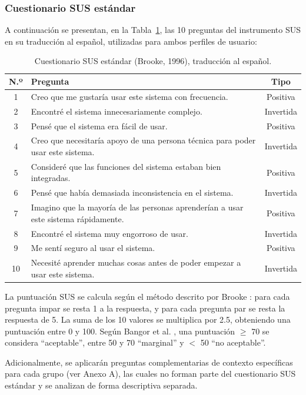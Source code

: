 \documentclass{iccmemoria}
\begin{document}
\subsubsection{Cuestionario SUS estándar}
A continuación se presentan, en la Tabla~\ref{tab:sus_cuestionario}, las 10 preguntas del instrumento SUS en su traducción al español, utilizadas para ambos perfiles de usuario:

\begin{table}[H]
\centering
\begin{tabular}{|c|p{10.5cm}|c|}
\hline
\textbf{N.º} & \textbf{Pregunta} & \textbf{Tipo} \\
\hline
1 & Creo que me gustaría usar este sistema con frecuencia. & Positiva \\
2 & Encontré el sistema innecesariamente complejo. & Invertida \\
3 & Pensé que el sistema era fácil de usar. & Positiva \\
4 & Creo que necesitaría apoyo de una persona técnica para poder usar este sistema. & Invertida \\
5 & Consideré que las funciones del sistema estaban bien integradas. & Positiva \\
6 & Pensé que había demasiada inconsistencia en el sistema. & Invertida \\
7 & Imagino que la mayoría de las personas aprenderían a usar este sistema rápidamente. & Positiva \\
8 & Encontré el sistema muy engorroso de usar. & Invertida \\
9 & Me sentí seguro al usar el sistema. & Positiva \\
10 & Necesité aprender muchas cosas antes de poder empezar a usar este sistema. & Invertida \\
\hline
\end{tabular}
\caption{Cuestionario SUS estándar (Brooke, 1996), traducción al español.}
\label{tab:sus_cuestionario}
\end{table}

La puntuación SUS se calcula según el método descrito por Brooke \cite{brooke1996}: para cada pregunta impar se resta 1 a la respuesta, y para cada pregunta par se resta la respuesta de 5. La suma de los 10 valores se multiplica por 2.5, obteniendo una puntuación entre 0 y 100. Según Bangor et al. \cite{bangor2008}, una puntuación $\geq$ 70 se considera ``aceptable'', entre 50 y 70 ``marginal'' y $<$ 50 ``no aceptable''.

Adicionalmente, se aplicarán preguntas complementarias de contexto específicas para cada grupo (ver Anexo A), las cuales no forman parte del cuestionario SUS estándar y se analizan de forma descriptiva separada.
\end{document}
